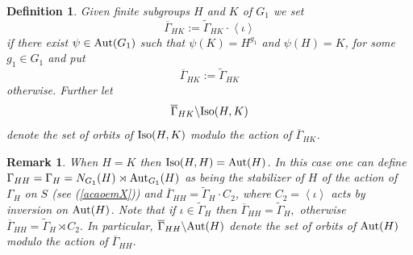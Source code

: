 \documentclass[a4paper,12pt]{article}
\newtheorem{deff}[thm]{Definition}
\def\aut {{\rm Aut}}
\def\inn {{\rm Inn}}
\def\Iso {{\rm Iso}}
\newtheorem{rem}[thm]{Remark}
\begin{document}
{ 

\begin{deff}
\label{novaacao} Given finite subgroups $H$ and $K$ of $G_1$ we set $$\overline{\Gamma}_{HK}:=\widetilde\Gamma_{HK}\cdot \left\langle \iota\right\rangle$$ if there exist $\psi \in \aut(G_1)$ such that $\psi(K)=H^{g_1}$ and $\psi(H)=K$, for some $g_1\in G_1$ and  put $$\overline{\Gamma}_{HK}:=\widetilde\Gamma_{HK}$$ otherwise. Further let $$\overline\Gamma_{HK}\backslash \Iso(H,K)$$ denote the set of orbits of $\Iso(H, K)$ modulo the action  of $\overline{\Gamma}_{HK}$.
\end{deff}





\begin{rem} \label{novaacao2} When $H=K$ then $\Iso(H,H)=\aut(H)$. In this case one can define   $\Gamma_{HH}=\Gamma_{H}=N_{G_1}(H) \rtimes\aut_{G_1}(H)$ as being the stabilizer of $H$ of  the action of $\Gamma_H$ on  $S$ (see (\ref{acaoemX})) and 
$\overline{\Gamma}_{HH}=\widetilde\Gamma_{H}\cdot C_2$, where $C_2= \left\langle \iota\right\rangle$ acts by inversion on $\aut(H)$. Note that if $\iota \in \widetilde\Gamma_H$ then $\overline{\Gamma}_{HH}=\widetilde\Gamma_{H},$ otherwise  $\overline{\Gamma}_{HH}=\widetilde\Gamma_{H}\rtimes C_2.$ 
In particular, $\overline{\Gamma}_{HH} \backslash \aut(H)$ denote the set of orbits of $\aut(H)$ modulo the action  of $\overline{\Gamma}_{HH}$.
\end{rem}




}
\end{document}
